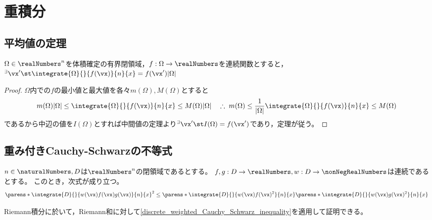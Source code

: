 \chapter{重積分}
    \section{平均値の定理}
        \begin{shadebox}
            $\Omega\in\realNumbers^n$を体積確定の有界閉領域，$f:\Omega\to\realNumbers$を連続関数とすると，$^\exists\vx'\st\integrate{\Omega}{}{f(\vx)}{n}{x} = f(\vx')|\Omega|$
        \end{shadebox}
        \begin{proof}
            $\Omega$内での$f$の最小値と最大値を各々$m(\Omega),M(\Omega)$とすると
            \[m(\Omega)|\Omega| \leq \integrate{\Omega}{}{f(\vx)}{n}{x} \leq M(\Omega)|\Omega|\quad\therefore\;m(\Omega) \leq \frac{1}{|\Omega|}\integrate{\Omega}{}{f(\vx)}{n}{x} \leq M(\Omega)\]
            であるから中辺の値を$I(\Omega)$とすれば中間値の定理より$^\exists\vx'\st I(\Omega) = f(\vx')$であり，定理が従う。
        \end{proof}
    \section{重み付きCauchy-Schwarzの不等式}
        \begin{shadebox}
            $n\in\naturalNumbers, D$は$\realNumbers^n$の閉領域であるとする。
            $f,g:D\to\realNumbers,w:D\to\nonNegRealNumbers$は連続であるとする。
            このとき，次式が成り立つ。
            \[ \parens*{\integrate{D}{}{w(\vx)f(\vx)g(\vx)}{n}{x}}^2 \leq \parens*{\integrate{D}{}{w(\vx)f(\vx)^2}{n}{x}} \parens*{\integrate{D}{}{w(\vx)g(\vx)^2}{n}{x}} \]
        \end{shadebox}
        Riemann積分に於いて，Riemann和に対して\ref{discrete_weighted_Cauchy_Schwarz_inequality}を適用して証明できる。
